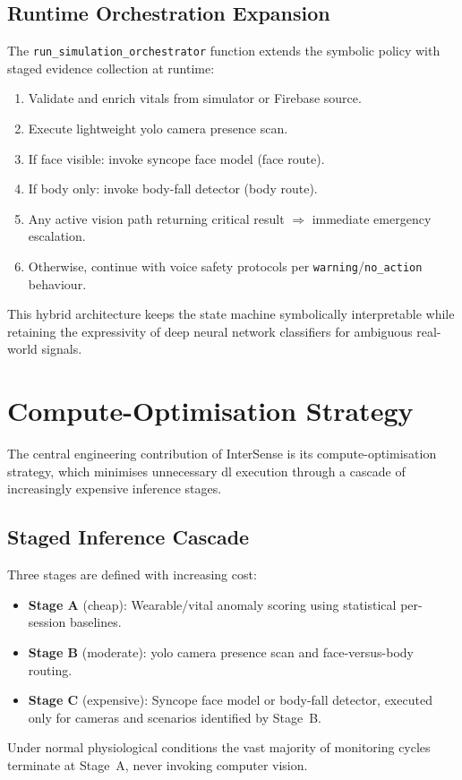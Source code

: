 \documentclass[10pt,twocolumn,a4paper]{article}
\begin{document}
\subsection{Runtime Orchestration Expansion}

The \texttt{run\_simulation\_orchestrator} function extends the
symbolic policy with staged evidence collection at runtime:
\begin{enumerate}
  \item Validate and enrich vitals from simulator or Firebase source.
  \item Execute lightweight \gls{yolo} camera presence scan.
  \item If face visible: invoke syncope face model (face route).
  \item If body only: invoke body-fall detector (body route).
  \item Any active vision path returning critical result
        $\Rightarrow$ immediate emergency escalation.
  \item Otherwise, continue with voice safety protocols per
        \texttt{warning}/\texttt{no\_action} behaviour.
\end{enumerate}
This hybrid architecture keeps the state machine symbolically
interpretable while retaining the expressivity of deep neural network
classifiers for ambiguous real-world signals.

\section{Compute-Optimisation Strategy}

The central engineering contribution of InterSense is its
compute-optimisation strategy, which minimises unnecessary \gls{dl}
execution through a cascade of increasingly expensive inference stages.

\subsection{Staged Inference Cascade}

Three stages are defined with increasing cost:
\begin{itemize}
  \item \textbf{Stage A} (cheap): Wearable/vital anomaly scoring using
        statistical per-session baselines.
  \item \textbf{Stage B} (moderate): \gls{yolo} camera presence scan
        and face-versus-body routing.
  \item \textbf{Stage C} (expensive): Syncope face model or body-fall
        detector, executed only for cameras and scenarios identified
        by Stage~B.
\end{itemize}
Under normal physiological conditions the vast majority of monitoring
cycles terminate at Stage~A, never invoking computer vision.
\end{document}
